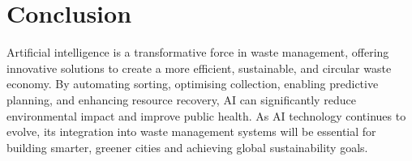 \section{Conclusion}

Artificial intelligence is a transformative force in waste management, offering innovative solutions to create a more efficient, sustainable, and circular waste economy. By automating sorting, optimising collection, enabling predictive planning, and enhancing resource recovery, AI can significantly reduce environmental impact and improve public health. As AI technology continues to evolve, its integration into waste management systems will be essential for building smarter, greener cities and achieving global sustainability goals.